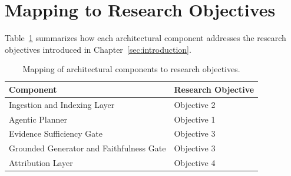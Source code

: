 \section{Mapping to Research Objectives}
Table~\ref{tab:objective-mapping} summarizes how each architectural component addresses the research objectives introduced in Chapter~\ref{sec:introduction}.

\begin{table}[htbp]
    \centering
    \begin{tabular}{ll}
        \toprule
        \textbf{Component} & \textbf{Research Objective} \\
        \midrule
        Ingestion and Indexing Layer & Objective 2 \\
        Agentic Planner & Objective 1 \\
        Evidence Sufficiency Gate & Objective 3 \\
        Grounded Generator and Faithfulness Gate & Objective 3 \\
        Attribution Layer & Objective 4 \\
        \bottomrule
    \end{tabular}
    \caption{Mapping of architectural components to research objectives.}
    \label{tab:objective-mapping}
\end{table}